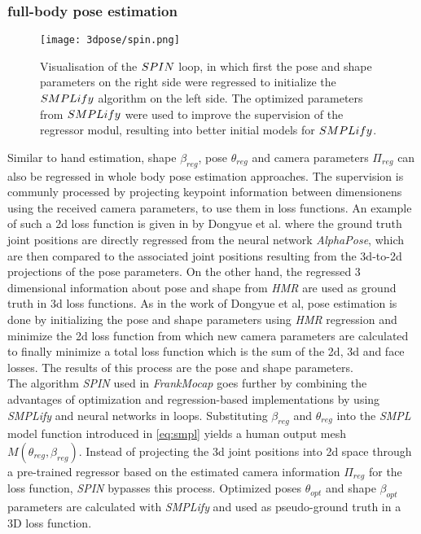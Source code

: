 \subsubsection{full-body pose estimation}
\begin{figure}[h]
	\centering
	\texttt{[image: 3dpose/spin.png]}
	\caption{Visualisation of the $\protect SPIN$ loop, in which first the pose and shape parameters on the right side were regressed to initialize the $\protect SMPLify$ algorithm on the left side. The optimized parameters from $\protect SMPLify$ were used to improve the supervision of the regressor modul, resulting into better initial models for $\protect SMPLify$. \cite{spin}}
	\label{fig:spin}
\end{figure}

Similar to hand estimation, shape $\beta_{reg}$, pose $\theta_{reg}$ and camera parameters $\Pi_{reg}$ can also be regressed in whole body pose estimation approaches. The supervision is communly processed by projecting keypoint information between dimensionens using the received camera parameters, to use them in loss functions. An example of such a 2d loss function is given in \cite{chen} by Dongyue et al. where the ground truth joint positions are directly regressed from the neural network \emph{AlphaPose}, which are then compared to the associated joint positions resulting from the 3d-to-2d projections of the pose parameters. On the other hand, the regressed 3 dimensional information about pose and shape from \emph{HMR} are used as ground truth in 3d loss functions. As in the work of Dongyue et al, pose estimation is done by initializing the pose and shape parameters using \emph{HMR} regression and minimize the 2d loss function from which new camera parameters are calculated to finally minimize a total loss function which is the sum of the 2d, 3d and face losses. The results of this process are the pose and shape parameters. \\
The algorithm \emph{SPIN} \cite{spin} used in \emph{FrankMocap} goes further by combining the advantages of optimization and regression-based implementations by using \emph{SMPLify} and neural networks in loops. Substituting $\beta_{reg}$ and $\theta_{reg}$ into the \emph{SMPL} model function introduced in \autoref{eq:smpl} yields a human output mesh $M(\theta_{reg},\beta_{reg})$. Instead of projecting the 3d joint positions into 2d space through a pre-trained regressor based on the estimated camera information $\Pi_{reg}$ for the loss function, \emph{SPIN} bypasses this process. Optimized poses $\theta_{opt}$ and shape $\beta_{opt}$ parameters are calculated with \emph{SMPLify} and used as pseudo-ground truth in a 3D loss function.\\ 
